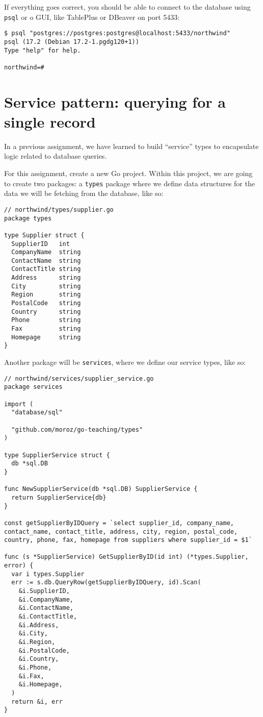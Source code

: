 \documentclass[a4paper,12pt]{article}
\begin{document}
If everything goes correct, you should be able to connect to the database using \texttt{psql} or o GUI, like TablePlus or DBeaver on port 5433:

\begin{verbatim}
$ psql "postgres://postgres:postgres@localhost:5433/northwind"
psql (17.2 (Debian 17.2-1.pgdg120+1))
Type "help" for help.

northwind=# 
\end{verbatim}

\section{Service pattern: querying for a single record}

In a previous assignment, we have learned to build ``service'' types to encapsulate logic related to database queries.

For this assignment, create a new Go project. Within this project, we are going to create two packages: a \texttt{types} package where we define data structures for the data we will be fetching from the database, like so:

\begin{verbatim}
// northwind/types/supplier.go
package types

type Supplier struct {
  SupplierID   int
  CompanyName  string
  ContactName  string
  ContactTitle string
  Address      string
  City         string
  Region       string
  PostalCode   string
  Country      string
  Phone        string
  Fax          string
  Homepage     string
}
\end{verbatim}

Another package will be \texttt{services}, where we define our service types, like so:

\begin{verbatim}
// northwind/services/supplier_service.go
package services

import (
  "database/sql"

  "github.com/moroz/go-teaching/types"
)

type SupplierService struct {
  db *sql.DB
}

func NewSupplierService(db *sql.DB) SupplierService {
  return SupplierService{db}
}

const getSupplierByIDQuery = `select supplier_id, company_name,
contact_name, contact_title, address, city, region, postal_code,
country, phone, fax, homepage from suppliers where supplier_id = $1`

func (s *SupplierService) GetSupplierByID(id int) (*types.Supplier, error) {
  var i types.Supplier
  err := s.db.QueryRow(getSupplierByIDQuery, id).Scan(
    &i.SupplierID,
    &i.CompanyName,
    &i.ContactName,
    &i.ContactTitle,
    &i.Address,
    &i.City,
    &i.Region,
    &i.PostalCode,
    &i.Country,
    &i.Phone,
    &i.Fax,
    &i.Homepage,
  )
  return &i, err
}
\end{verbatim}
\end{document}
